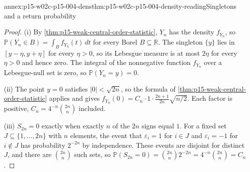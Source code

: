 \begin{annexitem}{annex:p15-w02c-p15-004-dens}{thm:p15-w02c-p15-004-density-reading}{Singletons and a return probability}
\begin{proof}
(i) By \cref{thm:p15-weak-central-order-statistic}, \(Y_n\) has the
density \(f_{Y_n}\), so
\(\mathbb P(Y_n\in B)=\int_Bf_{Y_n}(t)\,dt\) for every Borel
\(B\subseteq\mathbb R\). The singleton \(\{y\}\) lies in
\([y-\eta,y+\eta]\) for every \(\eta>0\), so its Lebesgue measure is at
most \(2\eta\) for every \(\eta>0\) and hence zero. The integral of the
nonnegative function \(f_{Y_n}\) over a Lebesgue-null set is zero, so
\(\mathbb P(Y_n=y)=0\).

(ii) The point \(y=0\) satisfies \(|0|<\sqrt{2n}\), so the formula of
\cref{thm:p15-weak-central-order-statistic} applies and gives
\(f_{Y_n}(0)=C_n\cdot1\cdot\frac{2n+1}{2n}\sqrt{n/2}\). Each factor is
positive, \(C_n=4^{-n}\binom{2n}{n}\) included.

(iii) \(S_{2n}=0\) exactly when exactly \(n\) of the \(2n\) signs equal
\(1\). For a fixed set \(J\subseteq\{1,\ldots,2n\}\) with \(n\)
elements, the event that \(\varepsilon_i=1\) for \(i\in J\) and
\(\varepsilon_i=-1\) for \(i\notin J\) has probability \(2^{-2n}\) by
independence. These events are disjoint for distinct \(J\), and there
are \(\binom{2n}{n}\) such sets, so
\(\mathbb P(S_{2n}=0)=\binom{2n}{n}2^{-2n}=4^{-n}\binom{2n}{n}=C_n\).
\end{proof}
\end{annexitem}
